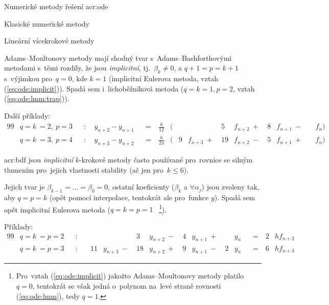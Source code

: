 \documentclass[thesis=M,czech]{FITthesis}[2012/06/26]
\newcommand{\acrlabel}[1]{acr:#1}
\newcommand{\acr}[1]{\acrshort{\acrlabel{#1}}}
\newcommand{\acrf}[1]{\acrfull{\acrlabel{#1}}}
\newcommand{\hl}[1]{\textit{#1}}
\newcommand{\rf}[1]{\ref{#1}}
\newcommand{\rfeq}[1]{(\rf{eq:#1})}
\begin{document}
\begin{section}{Numerické metody řešení \acr{ode}}
\begin{subsection}{Klasické numerické metody}
\begin{subsubsection}{Lineární vícekrokové metody}

\begin{paragraph}{Adams--Moultonovy metody}
\label{p:search:ode:classic:lmm:adamsm}
mají shodný tvar s~Adams--Bashforthovými metodami
s~těmi rozdíly, že jsou \hl{implicitní},
tj.~${\beta_k \neq 0}$,
a ${q+1 = p = k+1}$
s~výjimkou pro~${q = 0}$, kde ${k = 1}$
(implicitní Eulerova metoda, vztah \rfeq{ode:implicit}).
Spadá sem i~lichoběžníková metoda
(${q = k = 1}, {p = 2}$, vztah \rfeq{ode:lmm:trap}).

Další příklady:
\begin{alignat*}{99}
   &q = k~= 2, \: p = 3 &&: \quad y_{n+2} - y_{n+1} &&= \:
      & \frac{h}{12} & ( &   &         \: \: &  5 & f_{n+2} \:+\:
      & 8 & f_{n+1} \:-\: &   & f_{n} ) \\
   &q = k~= 3, \: p = 4 &&: \quad y_{n+3} - y_{n+2} &&= \:
      & \frac{h}{24} & ( & 9 & f_{n+3} \:+\: & 19 & f_{n+2} \:-\:
      & 5 & f_{n+1} \:+\: &   & f_{n} )
\end{alignat*}
\end{paragraph} %


\begin{paragraph}{\acrf{bdf}}\label{p:search:ode:classic:lmm:bdf}
jsou \hl{implicitní} $k$-krokové metody často používané
pro~rovnice se silným tlumením
pro~jejich vlastnosti stability
(ač jen pro~${k \leq 6}$).

Jejich tvar je
${\beta_{k-1} = \dots} = {\beta_{0} = 0}$,
ostatní koeficienty ($\beta_{k}$ a ${\forall \alpha_{j}}$)
jsou zvoleny tak, aby ${q = p = k}$
(opět pomocí interpolace,
tentokrát ale pro~funkce $y$).
Spadá sem opět implicitní Eulerova metoda
(${q = k = p = 1}$~%
\footnote{Pro~vztah \rfeq{ode:implicit}
jakožto Adams--Moultonovy metody platilo ${q = 0}$,
tentokrát se však jedná o~polynom na~levé straně rovnosti \rfeq{ode:lmm},
tedy ${q = 1}$.}).

Příklady:
\begin{alignat*}{99}
   &q = k~= p = 2&&: \quad &    &               &  3 & y_{n+2} \:-\:
      & 4 & y_{n+1} \:+\: &   & y_{n} &&= \: & 2 & h f_{n+2} \\
   &q = k~= p = 3&&: \quad & 11 & y_{n+3} \:-\: & 18 & y_{n+2} \:+\:
      & 9 & y_{n+1} \:-\: & 2 & y_{n} &&= \: & 6 & h f_{n+3}
\end{alignat*}
\end{paragraph} %


\end{subsubsection}
\end{subsection}
\end{section}
\end{document}
